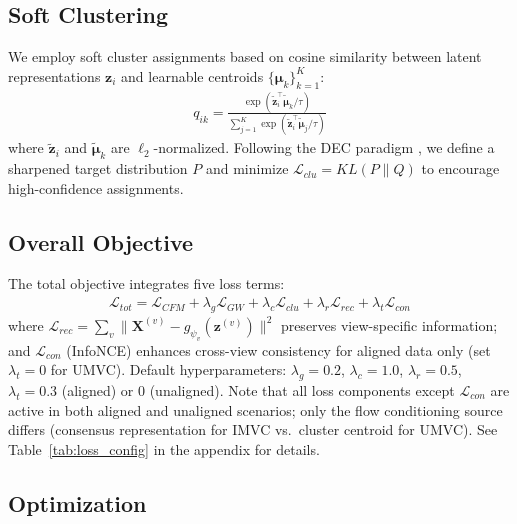 \documentclass{article}
\theoremstyle{plain}
\theoremstyle{definition}
\theoremstyle{remark}
\begin{document}
\subsection{Soft Clustering}\label{clustering}

We employ soft cluster assignments based on cosine similarity between latent representations $\mathbf{z}_i$ and learnable centroids $\{\boldsymbol{\mu}_k\}_{k=1}^K$:
\begin{align}
q_{ik} = \frac{\exp(\tilde{\mathbf{z}}_i^\top \tilde{\boldsymbol{\mu}}_k / \tau)}{\sum_{j=1}^{K} \exp(\tilde{\mathbf{z}}_i^\top \tilde{\boldsymbol{\mu}}_j / \tau)}
\end{align}
where $\tilde{\mathbf{z}}_i$ and $\tilde{\boldsymbol{\mu}}_k$ are $\ell_2$-normalized. Following the DEC paradigm \cite{xieUnsupervisedDeepEmbedding2016}, we define a sharpened target distribution $P$ and minimize $\mathcal{L}_{clu} = KL(P \| Q)$ to encourage high-confidence assignments.

\subsection{Overall Objective}\label{overall-objective}

The total objective integrates five loss terms:
\begin{align}
\mathcal{L}_{tot} = \mathcal{L}_{CFM} +\!\lambda_g \mathcal{L}_{GW} + \lambda_c \mathcal{L}_{clu} + \lambda_r \mathcal{L}_{rec} + \lambda_t \mathcal{L}_{con}
\end{align}
where 
$\mathcal{L}_{rec} = \sum_v \|\mathbf{X}^{(v)} - g_{\psi_v}(\mathbf{z}^{(v)})\|^2$ preserves view-specific information; and $\mathcal{L}_{con}$ (InfoNCE) enhances cross-view consistency for aligned data only (set $\lambda_t=0$ for UMVC). Default hyperparameters: $\lambda_g=0.2$, $\lambda_c=1.0$, $\lambda_r=0.5$, $\lambda_t=0.3$ (aligned) or $0$ (unaligned). Note that all loss components except $\mathcal{L}_{con}$ are active in both aligned and unaligned scenarios; only the flow conditioning source differs (consensus representation for IMVC vs.\ cluster centroid for UMVC). See Table~\ref{tab:loss_config} in the appendix for details.

\subsection{Optimization}\label{optimization}
\end{document}

